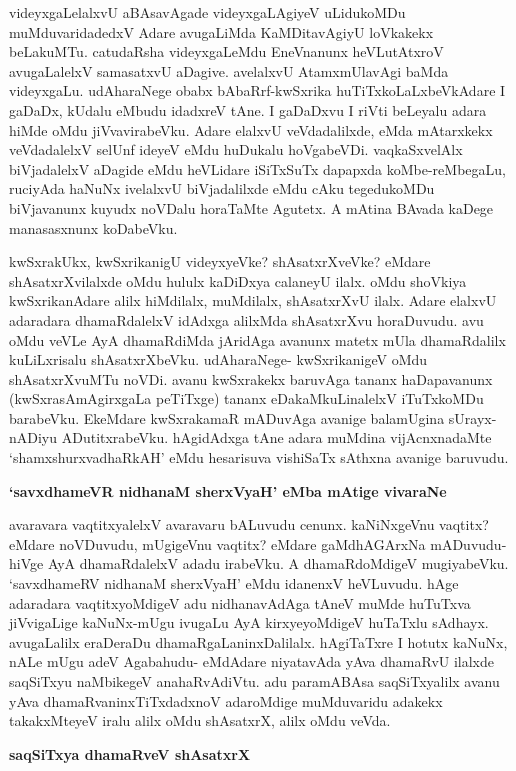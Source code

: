 \noindent
videyxgaLelalxvU aBAsavAgade videyxgaLAgiyeV uLidukoMDu muMduvari\-dadedxV Adare avugaLiMda KaMDitavAgiyU loVkakekx beLakuMTu. catudaRsha videyxgaLeMdu EneVnanunx heVLutAtxroV avugaLalelxV samasatxvU aDagive. avelalxvU AtamxmUlavAgi baMda videyxgaLu. udAharaNege obabx bAbaRrf-kwSxrika huTiTxkoLaLx\-beVkAdare I gaDaDx, kUdalu eMbudu idadxreV tAne. I gaDaDxvu I riVti beLeyalu adara hiMde oMdu jiVvavirabeVku. Adare elalxvU veVdadalilxde, eMda mAtarxkekx veVdadalelxV selUnf ideyeV eMdu huDukalu hoVgabeVDi. vaqkaSxvelAlx biVjadalelxV aDagide eMdu heVLidare iSiTxSuTx dapapxda koMbe-reMbe\-gaLu, ruciyAda haNuNx ivelalxvU biVjadalilxde eMdu cAku tegedukoMDu biVjavanunx kuyudx noVDalu horaTaMte Agutetx. A mAtina BAvada kaDege manasasxnunx koDabeVku. 

kwSxrakUkx, kwSxrikanigU videyxyeVke? shAsatxrXveVke? eMdare shAsatxrXvilalxde oMdu hululx kaDiDxya calaneyU ilalx. oMdu shoVkiya kwSxrikanAdare alilx hiMdilalx, muMdilalx, shAsatxrXvU ilalx. Adare elalxvU adaradara dhamaRdalelxV idAdxga alilxMda shAsatxrXvu horaDuvudu. avu oMdu veVLe AyA dhamaRdiMda jAridAga avanunx matetx mUla dhamaRdalilx kuLiLxrisalu shAsatxrXbeVku. udAharaNege- kwSxrikanigeV oMdu shAsatxrXvuMTu noVDi. avanu kwSxrakekx baruvAga tananx haDapavanunx (kwSxrasAmAgirxgaLa peTiTxge) tananx eDakaMkuLinalelxV iTuTxkoMDu barabeVku. EkeMdare kwSxrakamaR mADu\-vAga avanige balamUgina sUrayx-nADiyu ADutitxrabeVku. hAgidAdxga tAne adara muMdina vijAcnxna\-daMte `shamxshurxvadhaRkAH' eMdu hesarisuva vishiSaTx sAthxna avanige baruvudu.

{\bigskip
\noindent
{\large\bf `savxdhameVR nidhanaM sherxVyaH' eMba mAtige vivaraNe}}\label{197}
\medskip

\noindent
avaravara vaqtitxyalelxV avaravaru bALuvudu cenunx. kaNiNxgeVnu vaqtitx? eMdare noVDuvudu, mUgi\-geVnu vaqtitx? eMdare gaMdhAGArxNa mADuvudu- hiVge AyA dhamaRdalelxV adadu irabeVku. A dhamaR\-doMdigeV mugiyabeVku. `savxdhameRV nidhanaM sherxVyaH' eMdu idanenxV heVLuvudu. hAge adaradara vaqtitxyoMdigeV adu nidhanavAdAga tAneV muMde huTuTxva jiVvigaLige kaNuNx-mUgu ivugaLu AyA kirxyeyoMdigeV huTaTxlu sAdhayx. avugaLalilx eraDeraDu dhamaRgaLaninxDalilalx. hAgiTaTxre I hotutx kaNuNx, nALe mUgu adeV Agabahudu- eMdAdare niyata\break\-vAda yAva dhamaRvU ilalxde saqSiTxyu naMbikegeV anahaRvAdiVtu. adu paramA\-BAsa saqSiTxyalilx avanu yAva dhamaRvaninxTiTxdadxnoV adaroMdige muMduvaridu adakekx takakxMteyeV iralu alilx oMdu shAsatxrX, alilx oMdu veVda.

\eject

{\noindent
{\large\bf saqSiTxya dhamaRveV shAsatxrX}}
\medskip

